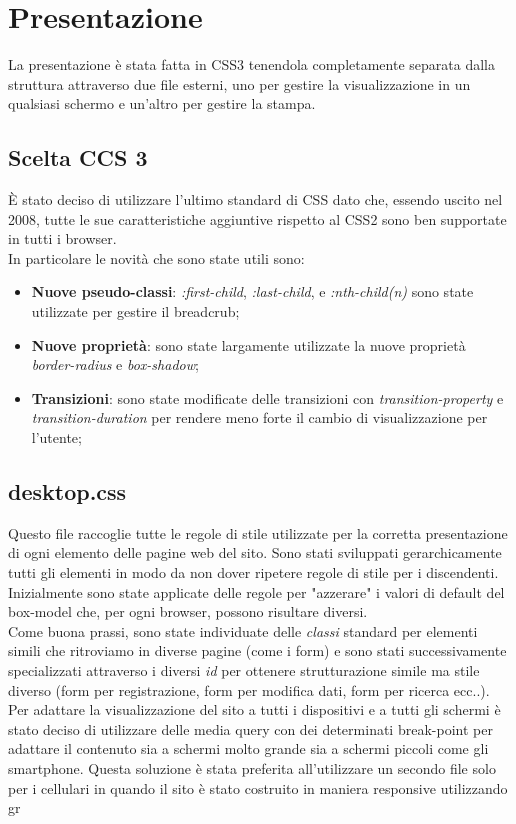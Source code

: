 \section{Presentazione}
	La presentazione è stata fatta in CSS3 tenendola completamente separata dalla struttura attraverso due file esterni, uno per gestire la visualizzazione in un qualsiasi schermo e un'altro per gestire la stampa.
	\subsection{Scelta CCS 3}
	È stato deciso di utilizzare l'ultimo standard di CSS dato che, essendo uscito nel 2008, tutte le sue caratteristiche aggiuntive rispetto al CSS2 sono ben supportate in tutti i browser. \\ In particolare le novità che sono state utili sono:
	\begin{itemize}
		\item \textbf{Nuove pseudo-classi}: \emph{:first-child}, \emph{:last-child}, e \emph{:nth-child(n)} sono state utilizzate per gestire il breadcrub;
		\item \textbf{Nuove proprietà}: sono state largamente utilizzate la nuove proprietà \emph{border-radius} e \emph{box-shadow};
		\item \textbf{Transizioni}: sono state modificate delle transizioni con \emph{transition-property} e \emph{transition-duration} per rendere meno forte il cambio di visualizzazione per l'utente;
	\end{itemize}
	\subsection{desktop.css}
	Questo file raccoglie tutte le regole di stile utilizzate per la corretta presentazione di ogni elemento delle pagine web del sito. Sono stati sviluppati gerarchicamente tutti gli elementi in modo da non dover ripetere regole di stile per i discendenti. \\
	Inizialmente sono state applicate delle regole per "azzerare" i valori di default del box-model che, per ogni browser, possono risultare diversi.\\
	Come buona prassi, sono state individuate delle \emph{classi} standard per elementi simili che ritroviamo in diverse pagine (come i form) e sono stati successivamente specializzati attraverso i diversi \emph{id} per ottenere strutturazione simile ma stile diverso (form per registrazione, form per modifica dati, form per ricerca ecc..).\\
	Per adattare la visualizzazione del sito a tutti i dispositivi e a tutti gli schermi è stato deciso di utilizzare delle media query con dei determinati break-point per adattare il contenuto sia a schermi molto grande sia a schermi piccoli come gli smartphone. Questa soluzione è stata preferita all'utilizzare un secondo file solo per i cellulari in quando il sito è stato costruito in maniera responsive utilizzando gr
	
